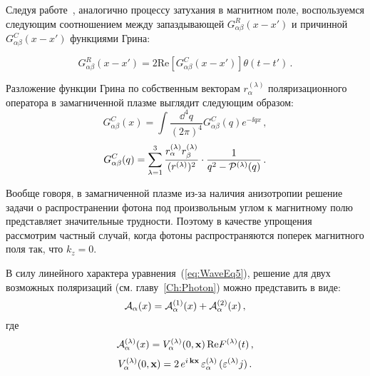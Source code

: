 Следуя работе~\cite{MikhChist:2001}, аналогично процессу затухания в магнитном 
поле, воспользуемся следующим соотношением между запаздывающей 
$G^R_{\alpha\beta}(x-x')$ и причинной $G^C_{\alpha\beta}(x-x')$ функциями Грина:

\begin{equation}\label{eq:RetCasualGreen}
G^R_{\alpha\beta}(x-x')= 2 \mathrm{Re} \left[G^C_{\alpha\beta}(x-x')\right]\theta(t-t')\, .
\end{equation}

Разложение функции Грина по собственным векторам 
$r_\alpha^{(\lambda)}$ поляризационного оператора в замагниченной плазме 
выглядит следующим образом:
\begin{equation}\label{eq:InvGcFourier}
	G^C_{\alpha\beta}(x)=\int \frac{\dd^4q}{(2\pi)^4}G^C_{\alpha \beta}(q) e^{-\ii qx}\, ,
\end{equation}
\begin{equation}\label{eq:GcFourier}
	G^C_{\alpha\beta}(q)=\sum_{\lambda=1}^{3}\frac{r_\alpha^{(\lambda)}r^{(\lambda)}_\beta}{(r^{(\lambda)})^2}\cdot
	 \frac{1}{q^2-{\cal P}^{(\lambda)}(q)}\, .
\end{equation}

 Вообще говоря, в замагниченной плазме из-за наличия 
анизотропии решение задачи о распространении фотона под произвольным углом к 
магнитному полю представляет значительные трудности. Поэтому в качестве 
упрощения рассмотрим частный случай, когда фотоны распространяются поперек 
магнитного поля так, что $k_z=0$.

В силу линейного характера уравнения~(\ref{eq:WaveEq5}), 
решение для двух возможных поляризаций (см. 
главу~\ref{Ch:Photon}) можно представить в виде:
\begin{equation}\label{eq:ASoveDivide}
	{\cal A}_\alpha(x)={\cal A}^{(1)}_\alpha(x)+{\cal A}^{(2)}_\alpha(x)\, ,
\end{equation}
где 
%
\begin{eqnarray}\label{eq:ASoveF}                     		
{\cal A}^{(\lambda)}_{\alpha} (x) = V^{(\lambda)}_\alpha (0, {\bf x}) \, \text{Re} F^{(\lambda)} (t) \, ,
\label{eq:V}
\end{eqnarray}
\begin{eqnarray}
V^{(\lambda)}_\alpha (0, {\bf x}) = 2\, e^{ i\, {\bf k x}} \, 
\varepsilon^{(\lambda)}_\alpha \, (\varepsilon^{(\lambda)} j)\, .
\label{eq:partialV}
\end{eqnarray}
%

